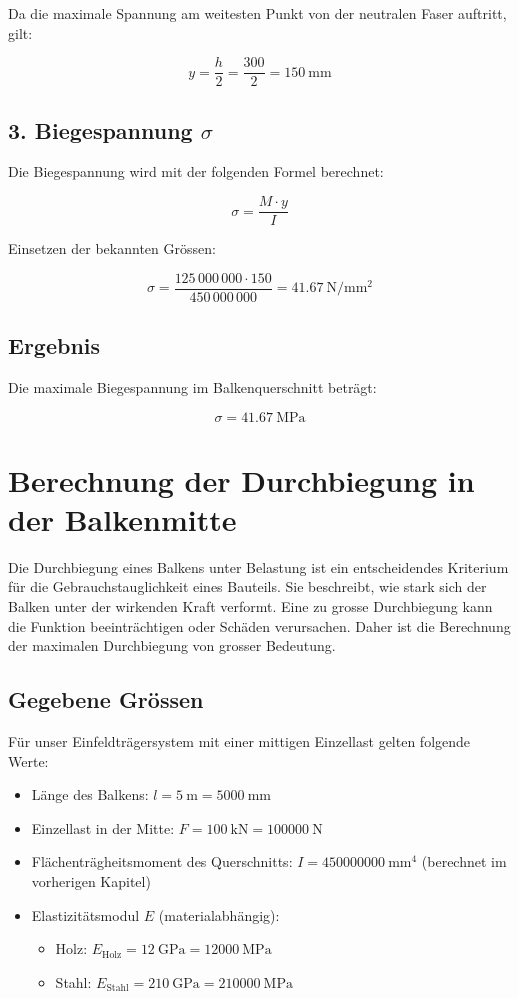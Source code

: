 	Da die maximale Spannung am weitesten Punkt von der neutralen Faser auftritt, gilt:
	
	\[
	y = \frac{h}{2} = \frac{300}{2} = \SI{150}{\milli\meter}
	\]
	
	\subsection*{3. Biegespannung $\sigma$}
	
	Die Biegespannung wird mit der folgenden Formel berechnet:
	
	\[
	\sigma = \frac{M \cdot y}{I}
	\]
	
	Einsetzen der bekannten Grössen:
	
	\[
	\sigma = \frac{125\,000\,000 \cdot 150}{450\,000\,000} = \SI{41.67}{\newton\per\milli\meter\squared}
	\]
	
	\subsection*{Ergebnis}
	
	Die maximale Biegespannung im Balkenquerschnitt beträgt:
	
	\[
	\boxed{\sigma = \SI{41.67}{\mega\pascal}}
	\]
	
	
	\section*{Berechnung der Durchbiegung in der Balkenmitte}
	
	Die Durchbiegung eines Balkens unter Belastung ist ein entscheidendes Kriterium für die Gebrauchstauglichkeit eines Bauteils. 
	Sie beschreibt, wie stark sich der Balken unter der wirkenden Kraft verformt. 
	Eine zu grosse Durchbiegung kann die Funktion beeinträchtigen oder Schäden verursachen. 
	Daher ist die Berechnung der maximalen Durchbiegung von grosser Bedeutung.
	
	\subsection*{Gegebene Grössen}
	
	Für unser Einfeldträgersystem mit einer mittigen Einzellast gelten folgende Werte:
	
	\begin{itemize}
		\item Länge des Balkens: \( l = \SI{5}{\meter} = \SI{5000}{\milli\meter} \)
		\item Einzellast in der Mitte: \( F = \SI{100}{\kilo\newton} = \SI{100000}{\newton} \)
		\item Flächenträgheitsmoment des Querschnitts: \( I = \SI{450000000}{\milli\meter^4} \) (berechnet im vorherigen Kapitel)
		\item Elastizitätsmodul \( E \) (materialabhängig):
		\begin{itemize}
			\item Holz: \( E_{\text{Holz}} = \SI{12}{\giga\pascal} = \SI{12000}{\mega\pascal} \)
			\item Stahl: \( E_{\text{Stahl}} = \SI{210}{\giga\pascal} = \SI{210000}{\mega\pascal} \)
		\end{itemize}
	\end{itemize}
	
